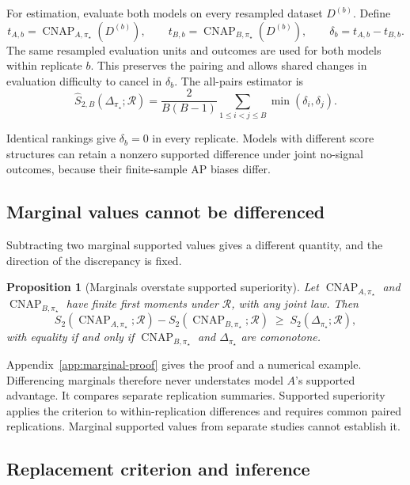 \documentclass[11pt]{article}
\newcommand{\CNAP}{\operatorname{CNAP}}
\newcommand{\Regime}{\mathcal{R}}
\newtheorem{proposition}{Proposition}
\theoremstyle{remark}
\begin{document}
For estimation, evaluate both models on every resampled dataset $D^{(b)}$. Define
\[
t_{A,b}=\CNAP_{A,\pi_\star}(D^{(b)}),
\qquad
t_{B,b}=\CNAP_{B,\pi_\star}(D^{(b)}),
\qquad
\delta_b=t_{A,b}-t_{B,b}.
\]
The same resampled evaluation units and outcomes are used for both models within replicate $b$. This preserves the pairing and allows shared changes in evaluation difficulty to cancel in $\delta_b$. The all-pairs estimator is
\begin{equation}
\widehat S_{2,B}(\Delta_{\pi_\star};\Regime)
=
\frac{2}{B(B-1)}
\sum_{1\leq i<j\leq B}
\min(\delta_i,\delta_j).
\label{eq:paired-estimator}
\end{equation}

Identical rankings give $\delta_b=0$ in every replicate. Models with different score structures can retain a nonzero supported difference under joint no-signal outcomes, because their finite-sample AP biases differ.

\subsection{Marginal values cannot be differenced}

Subtracting two marginal supported values gives a different quantity, and the direction of the discrepancy is fixed.

\begin{proposition}[Marginals overstate supported superiority]
Let $\CNAP_{A,\pi_\star}$ and $\CNAP_{B,\pi_\star}$ have finite first moments under $\Regime$, with any joint law. Then
\[
S_2(\CNAP_{A,\pi_\star};\Regime)
-
S_2(\CNAP_{B,\pi_\star};\Regime)
\;\geq\;
S_2(\Delta_{\pi_\star};\Regime),
\]
with equality if and only if $\CNAP_{B,\pi_\star}$ and $\Delta_{\pi_\star}$ are comonotone.
\end{proposition}

Appendix~\ref{app:marginal-proof} gives the proof and a numerical example. Differencing marginals therefore never understates model $A$'s supported advantage. It compares separate replication summaries. Supported superiority applies the criterion to within-replication differences and requires common paired replications. Marginal supported values from separate studies cannot establish it.

\subsection{Replacement criterion and inference}
\label{sec:superiority}
\end{document}
